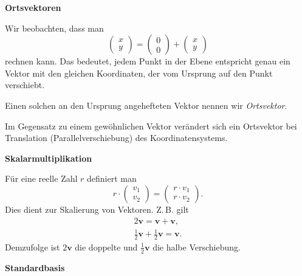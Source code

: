 \documentclass[9pt]{beamer}
\newcommand{\bv}[1]{\mathbf{#1}}
\newcommand{\strong}[1]{\textsf{\textbf{#1}}}
\newcommand{\parspace}{\vspace{0.8em}}
\begin{document}
\begin{frame}
\begin{center}
\strong{Ortsvektoren}
\end{center}
\end{frame}

\begin{frame}
Wir beobachten, dass man
\[\begin{pmatrix}x\\ y\end{pmatrix}
= \begin{pmatrix}0\\ 0\end{pmatrix} + \begin{pmatrix}x\\ y\end{pmatrix}\]
rechnen kann. Das bedeutet, jedem Punkt in der Ebene entspricht genau
ein Vektor mit den gleichen Koordinaten, der vom Ursprung auf den Punkt
verschiebt.\pause

\parspace
Einen solchen an den Ursprung angehefteten Vektor nennen wir \emph{Ortsvektor}.\pause

\parspace
Im Gegensatz zu einem gewöhnlichen Vektor verändert sich ein Ortsvektor
bei Translation (Parallelverschiebung) des Koordinatensystems.
\end{frame}

\begin{frame}
\begin{center}
\strong{Skalarmultiplikation}
\end{center}
\end{frame}

\begin{frame}
Für eine reelle Zahl $r$ definiert man
\[r\cdot\begin{pmatrix}v_1\\ v_2\end{pmatrix}
= \begin{pmatrix}r\cdot v_1\\ r\cdot v_2\end{pmatrix}.\]\pause
Dies dient zur Skalierung von Vektoren. Z.\,B. gilt
\begin{gather*}
2\bv v = \bv v + \bv v,\\
\tfrac{1}{2}\bv v + \tfrac{1}{2}\bv v = \bv v.
\end{gather*}
Demzufolge ist $2\bv v$ die doppelte und $\tfrac{1}{2}\bv v$ die halbe
Verschiebung.
\end{frame}

\begin{frame}
\begin{center}
\strong{Standardbasis}
\end{center}
\end{frame}
\end{document}
